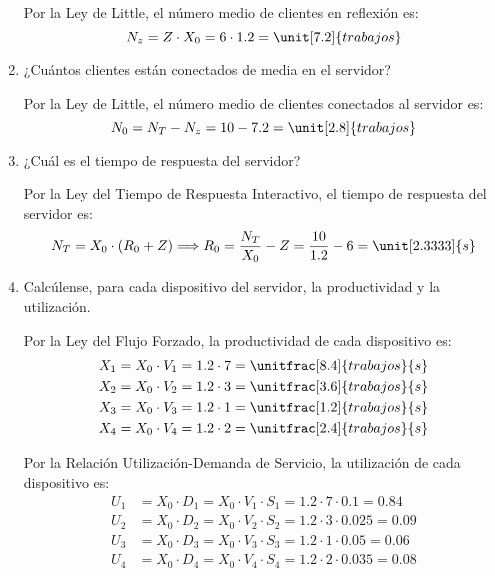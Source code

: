 \begin{ejercicio}
\begin{enumerate}
        Por la Ley de Little, el número medio de clientes en reflexión es:
        \begin{equation*}
            N_z = Z \cdot X_0 = 6 \cdot 1.2 = \unit[7.2]{trabajos}
        \end{equation*}
        \item ¿Cuántos clientes están conectados de media en el servidor?
        
        Por la Ley de Little, el número medio de clientes conectados al servidor es:
        \begin{equation*}
            N_0 = N_T - N_z = 10 - 7.2 = \unit[2.8]{trabajos}
        \end{equation*}
        \item ¿Cuál es el tiempo de respuesta del servidor?
        
        Por la Ley del Tiempo de Respuesta Interactivo, el tiempo de respuesta del servidor es:
        \begin{equation*}
            N_T = X_0 \cdot (R_0 + Z)
            \Longrightarrow R_0 = \dfrac{N_T}{X_0} - Z = \dfrac{10}{1.2} - 6 = \unit[2.3333]{s}
        \end{equation*}
        \item Calcúlense, para cada dispositivo del servidor, la productividad y la utilización.
        
        Por la Ley del Flujo Forzado, la productividad de cada dispositivo es:
        \begin{align*}
            X_1 &= X_0 \cdot V_1 = 1.2 \cdot 7 = \unitfrac[8.4]{trabajos}{s} \\
            X_2 &= X_0 \cdot V_2 = 1.2 \cdot 3 = \unitfrac[3.6]{trabajos}{s} \\
            X_3 &= X_0 \cdot V_3 = 1.2 \cdot 1 = \unitfrac[1.2]{trabajos}{s} \\
            X_4 &= X_0 \cdot V_4 = 1.2 \cdot 2 = \unitfrac[2.4]{trabajos}{s}
        \end{align*}

        Por la Relación Utilización-Demanda de Servicio, la utilización de cada dispositivo es:
        \begin{align*}
            U_1 &= X_0 \cdot D_1 = X_0 \cdot V_1 \cdot S_1 = 1.2 \cdot 7 \cdot 0.1 = 0.84 \\
            U_2 &= X_0 \cdot D_2 = X_0 \cdot V_2 \cdot S_2 = 1.2 \cdot 3 \cdot 0.025 = 0.09 \\
            U_3 &= X_0 \cdot D_3 = X_0 \cdot V_3 \cdot S_3 = 1.2 \cdot 1 \cdot 0.05 = 0.06 \\
            U_4 &= X_0 \cdot D_4 = X_0 \cdot V_4 \cdot S_4 = 1.2 \cdot 2 \cdot 0.035 = 0.08
        \end{align*}
    \end{enumerate}
\end{ejercicio}
